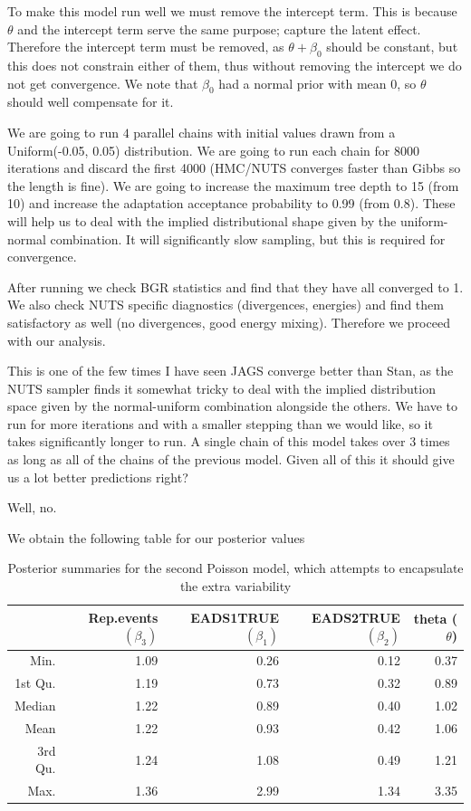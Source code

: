 \documentclass[10pt]{extarticle}
\begin{document}
To make this model run well we must remove the intercept term. This is because $\theta$ and the intercept term serve the same purpose; capture the latent effect. Therefore the intercept term must be removed, as $\theta + \beta_0$ should be constant, but this does not constrain either of them, thus without removing the intercept we do not get convergence. We note that $\beta_0$ had a normal prior with mean 0, so $\theta$ should well compensate for it.

We are going to run $4$ parallel chains with initial values drawn from a Uniform(-0.05, 0.05) distribution. We are going to run each chain for 8000 iterations and discard the first 4000 (HMC/NUTS converges faster than Gibbs so the length is fine). We are going to increase the maximum tree depth to 15 (from 10) and increase the adaptation acceptance probability to 0.99 (from 0.8). These will help us to deal with the implied distributional shape given by the uniform-normal combination. It will significantly slow sampling, but this is required for convergence.

After running we check BGR statistics and find that they have all converged to 1. We also check NUTS specific diagnostics (divergences, energies) and find them satisfactory as well (no divergences, good energy mixing). Therefore we proceed with our analysis.

This is one of the few times I have seen JAGS converge better than Stan, as the NUTS sampler finds it somewhat tricky to deal with the implied distribution space given by the normal-uniform combination alongside the others. We have to run for more iterations and with a smaller stepping than we would like, so it takes significantly longer to run. A single chain of this model takes over 3 times as long as all of the chains of the previous model. Given all of this it should give us a lot better predictions right?

Well, no.

We obtain the following table for our posterior values

\begin{table}[ht]
	\centering
	\begin{tabular}{r|rrrr}
		\hline
		& Rep.events $(\beta_3)$ & EADS1TRUE $(\beta_1)$ & EADS2TRUE $(\beta_2)$ & theta ($\theta$) \\ 
		\hline
		Min. & 1.09 & 0.26 & 0.12 & 0.37 \\ 
		1st Qu. & 1.19 & 0.73 & 0.32 & 0.89 \\ 
		Median & 1.22 & 0.89 & 0.40 & 1.02 \\ 
		Mean & 1.22 & 0.93 & 0.42 & 1.06 \\ 
		3rd Qu. & 1.24 & 1.08 & 0.49 & 1.21 \\ 
		Max. & 1.36 & 2.99 & 1.34 & 3.35 \\ 
		\hline
	\end{tabular}
\caption{Posterior summaries for the second Poisson model, which attempts to encapsulate the extra variability}
\label{tab:postsum_poexv}
\end{table}
\end{document}
